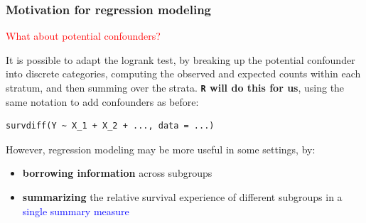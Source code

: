 \documentclass[12pt, 
hyperref={colorlinks=true, linkcolor=blue, urlcolor=cyan},dvipsnames]{beamer}
\begin{document}
\begin{frame}[fragile]
\frametitle{Motivation for regression modeling}

\textcolor{red}{What about potential confounders?} \pause

It is \textcolor{BurntOrange}{possible} to adapt the logrank test, by breaking up the potential confounder into discrete categories, computing the observed and expected counts within each stratum, and then summing over the strata. \textbf{\texttt{R} will do this for us}, using the same notation to add confounders as before:\vspace{-0.3cm} 
\begin{verbatim}
survdiff(Y ~ X_1 + X_2 + ..., data = ...)
\end{verbatim}\vspace{-0.5cm}

However, regression modeling may be more useful in some settings, by: \vspace{-0.3cm}
\begin{itemize}
\item \textbf{borrowing information} across subgroups
\item \textbf{summarizing} the relative survival experience of different subgroups in a \textcolor{blue}{single summary measure}
\end{itemize}
\end{frame}
\end{document}

